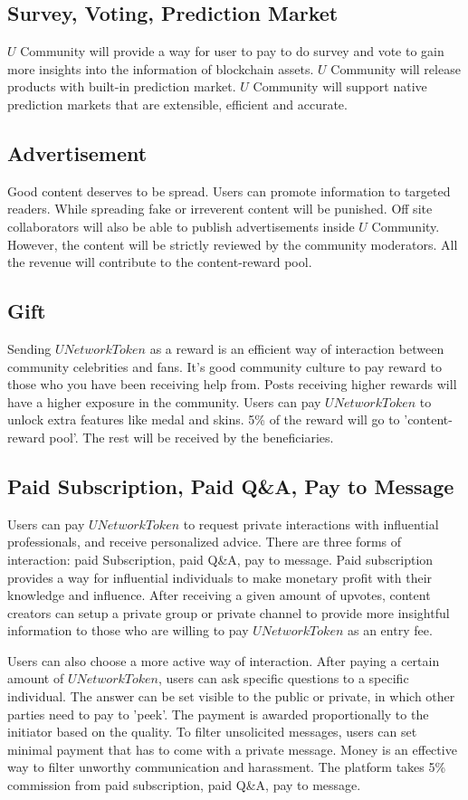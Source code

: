 \subsection{Survey, Voting, Prediction Market}
$U$ Community will provide a way for user to pay to do survey and vote to gain more insights into the information of blockchain assets. $U$ Community will release products with built-in prediction market. $U$ Community will support native prediction markets that are extensible, efficient and accurate.
\subsection{Advertisement}
Good content deserves to be spread. Users can promote information to targeted readers. While spreading fake or irreverent content will be punished.  
Off site collaborators will also be able to publish advertisements inside $U$ Community. However, the content will be strictly reviewed by the community moderators. All the revenue will contribute to the content-reward pool. 
\subsection{Gift}
Sending $UNetworkToken$ as a reward is an efficient way of interaction between community celebrities and fans. It's good community culture to pay reward to those who you have been receiving help from. Posts receiving higher rewards will have a higher exposure in the community. Users can pay $UNetworkToken$ to unlock extra features like medal and skins. 5\% of the reward will go to 'content-reward pool'. The rest will be received by the beneficiaries. 
\subsection{Paid Subscription, Paid Q\&A, Pay to Message}
Users can pay $UNetworkToken$ to request private interactions with influential professionals, and receive personalized advice. There are three forms of interaction: paid Subscription, paid Q\&A, pay to message. 
Paid subscription provides a way for influential individuals to make monetary profit with their knowledge and influence. After receiving a given amount of upvotes, content creators can setup a private group or private channel to provide more insightful information to those who are willing to pay $UNetworkToken$ as an entry fee. 
	
Users can also choose a more active way of interaction. After paying a certain amount of $UNetworkToken$, users can ask specific questions to a specific individual. The answer can be set visible to the public or private, in which other parties need to pay to 'peek'. The payment is awarded proportionally to the initiator based on the quality.   							
To filter unsolicited messages, users can set minimal payment that has to come with a private message. Money is an effective way to filter unworthy communication and harassment. 
The platform takes 5\% commission from paid subscription, paid Q\&A, pay to message. 
